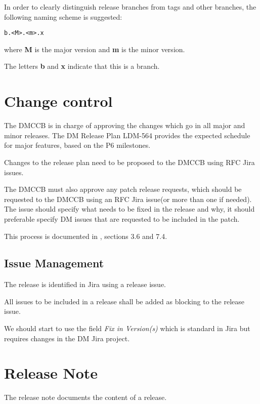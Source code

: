 In order to clearly distinguish release branches from tags and other branches, the following naming scheme is suggested:

\begin{verbatim}
b.<M>.<m>.x
\end{verbatim}

where {\bf M} is the major version and {\bf m} is the minor version.

The letters {\bf b} and {\bf x} indicate that this is a branch.

\newpage
\section{Change control} \label{sec:changecontrol}

The DMCCB is in charge of approving the changes which go in  all major and minor releases.
The DM Release Plan LDM-564 provides the expected schedule for major features, based on the P6 milestones.

Changes to the release plan need to be proposed to the DMCCB using RFC Jira issues.

The DMCCB must  also  approve any  patch release requests,
which should  be requested to the DMCCB using an RFC Jira issue(or more than one if needed).
The issue should specify what needs to be fixed in the release and why, it should preferable specify DM issues that are requested to be included in the patch.

This process is documented in , sections 3.6 and 7.4.


\subsection{Issue Management} \label{sec:issues}

The release is identified in Jira using a release issue.

All issues to be included in a release shall be added as blocking to the release issue.

We should start to  use the field \textit{Fix in Version(s)} which is standard in Jira
but requires changes in the DM Jira project.


\newpage
\section{Release Note} \label{sec:relnote}

The release note documents the content of a release.

